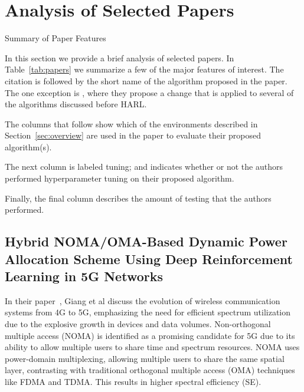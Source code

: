 \documentclass[journal]{IEEEtran}
\begin{document}
\section{Analysis of Selected Papers}
\label{sec:selected_papers}

\begin{table*}
    \caption[]{Summary of Paper Features}
    \label{tab:papers}
    \renewcommand{\arraystretch}{1.5}
\end{table*}

In this section we provide a brief analysis of selected papers. 
In Table~\ref{tab:papers} we summarize a few of the major features of interest.
The citation is followed by the short name of the algorithm proposed in the paper.
The one exception is \cite{zhong2024}, where they propose a change that is applied to several
of the algorithms discussed before HARL.

The columns that follow show which of the environments described in Section~\ref{sec:overview}
are used in the paper to evaluate their proposed algorithm(s).

The next column is labeled tuning; and indicates whether or not the authors performed 
hyperparameter tuning on their proposed algorithm. 

Finally, the final column describes the amount of testing that the authors performed.


\subsection{Hybrid NOMA/OMA-Based Dynamic Power Allocation Scheme 
Using Deep Reinforcement Learning in 5G Networks} In their 
paper~\cite{giang2020}, Giang et al discuss the evolution of wireless communication systems
from 4G to 5G, emphasizing the need for efficient spectrum utilization due to the explosive growth 
in devices and data volumes. Non-orthogonal multiple access (NOMA) is identified as a promising 
candidate for 5G due to its ability to allow multiple users to share time and spectrum resources.
NOMA uses power-domain multiplexing, allowing multiple users to share the same spatial layer, 
contrasting with traditional orthogonal multiple access (OMA) techniques like FDMA and TDMA. 
This results in higher spectral efficiency (SE).
\end{document}
